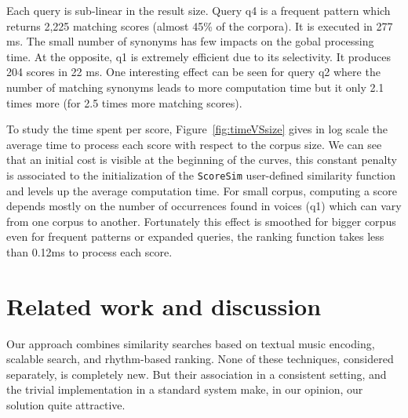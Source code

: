\documentclass[letterpaper, 11pt]{article}
\begin{document}
Each query is sub-linear in the result size. Query q4 is a frequent pattern
which returns 2,225 matching scores (almost 45\% of the corpora). It is executed in 277 ms. The small number of synonyms has few impacts on the gobal processing time.
At the opposite, q1 is extremely efficient due to its selectivity. It produces  204 scores in 22 ms.
One interesting effect can be seen for query q2 where the number of matching synonyms leads to more computation time but it only 2.1 times more (for 2.5 times more matching scores).



 

%




%

To study the time spent per score, Figure~\ref{fig:timeVSsize} gives in log scale the average time to process each score with respect to the corpus size.
We can see that an initial cost is visible at the beginning of the curves, this constant penalty is associated to the initialization of the \texttt{ScoreSim} user-defined similarity function and levels up the average computation time.
For small corpus, computing a score depends mostly on the number of occurrences found in voices (q1) which can vary from one corpus to another.
Fortunately this effect is smoothed for bigger corpus even for frequent patterns or expanded queries, the ranking function takes less than 0.12ms to process each score.
 
 
 
 
\section{Related work and discussion}\label{sec:rw}

Our approach combines similarity searches based on textual music encoding, 
scalable search, and rhythm-based ranking. None of these techniques, considered
separately, is completely new. But their association in a consistent setting,
and the trivial implementation in a standard system make, in our opinion,
our solution quite attractive. 
\end{document}
